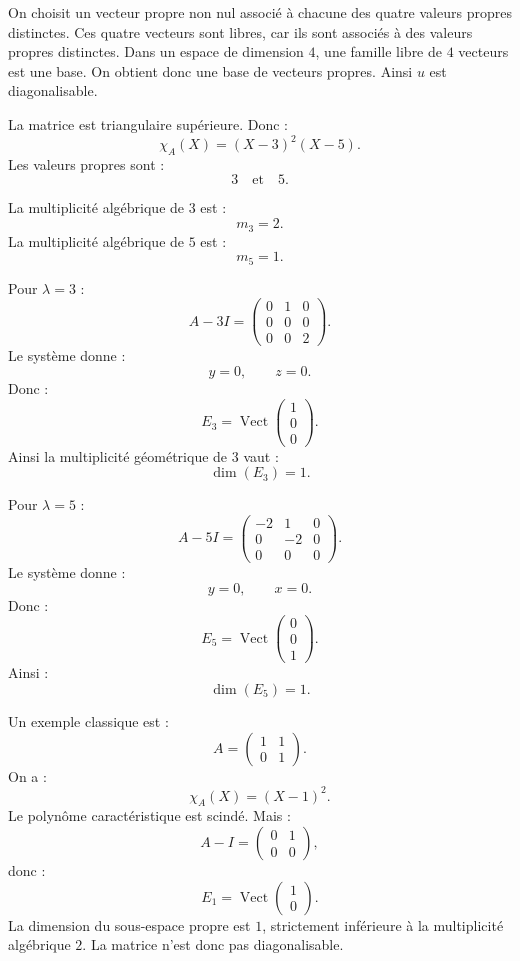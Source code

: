 \documentclass[11pt,a4paper]{article}
\newcommand{\Vect}{\operatorname{Vect}}
\begin{document}
\begin{correctionbox}[7]
On choisit un vecteur propre non nul associé à chacune des quatre valeurs propres distinctes.  
Ces quatre vecteurs sont libres, car ils sont associés à des valeurs propres distinctes.  
Dans un espace de dimension \(4\), une famille libre de \(4\) vecteurs est une base.  
On obtient donc une base de vecteurs propres.  
Ainsi \(u\) est diagonalisable.
\end{correctionbox}

\begin{correctionbox}[8]
La matrice est triangulaire supérieure.  
Donc :
\[
\chi_A(X)=(X-3)^2(X-5).
\]
Les valeurs propres sont :
\[
3
\quad\text{et}\quad
5.
\]

La multiplicité algébrique de \(3\) est :
\[
m_3=2.
\]
La multiplicité algébrique de \(5\) est :
\[
m_5=1.
\]

Pour \(\lambda=3\) :
\[
A-3I=
\begin{pmatrix}
0&1&0\\
0&0&0\\
0&0&2
\end{pmatrix}.
\]
Le système donne :
\[
y=0,
\qquad
z=0.
\]
Donc :
\[
E_3=\Vect
\begin{pmatrix}
1\\0\\0
\end{pmatrix}.
\]
Ainsi la multiplicité géométrique de \(3\) vaut :
\[
\dim(E_3)=1.
\]

Pour \(\lambda=5\) :
\[
A-5I=
\begin{pmatrix}
-2&1&0\\
0&-2&0\\
0&0&0
\end{pmatrix}.
\]
Le système donne :
\[
y=0,
\qquad
x=0.
\]
Donc :
\[
E_5=\Vect
\begin{pmatrix}
0\\0\\1
\end{pmatrix}.
\]
Ainsi :
\[
\dim(E_5)=1.
\]
\end{correctionbox}

\begin{correctionbox}[9]
Un exemple classique est :
\[
A=
\begin{pmatrix}
1&1\\
0&1
\end{pmatrix}.
\]
On a :
\[
\chi_A(X)=(X-1)^2.
\]
Le polynôme caractéristique est scindé.  
Mais :
\[
A-I=
\begin{pmatrix}
0&1\\
0&0
\end{pmatrix},
\]
donc :
\[
E_1=\Vect
\begin{pmatrix}
1\\0
\end{pmatrix}.
\]
La dimension du sous-espace propre est \(1\), strictement inférieure à la multiplicité algébrique \(2\).  
La matrice n'est donc pas diagonalisable.
\end{correctionbox}
\end{document}
